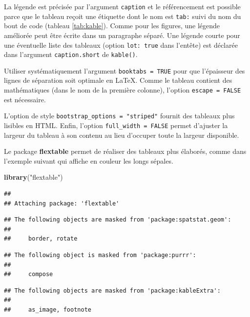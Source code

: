 \documentclass[
  12pt,
  french,
  a4paper,
  extrafontsizes,onecolumn,openright
  ]{memoir}
\newenvironment{Shaded}{\begin{snugshade}}{\end{snugshade}}
\newcommand{\KeywordTok}[1]{\textcolor[rgb]{0.13,0.29,0.53}{\textbf{#1}}}
\newcommand{\NormalTok}[1]{#1}
\newcommand{\StringTok}[1]{\textcolor[rgb]{0.31,0.60,0.02}{#1}}
\begin{document}
La légende est précisée par l'argument \texttt{caption} et le référencement est possible parce que le tableau reçoit une étiquette dont le nom est \texttt{tab:} suivi du nom du bout de code (tableau \ref{tab:kable}).
Comme pour les figures, une légende améliorée peut être écrite dans un paragraphe séparé.
Une légende courte pour une éventuelle liste des tableaux (option \texttt{lot:\ true} dans l'entête) est déclarée dans l'argument \texttt{caption.short} de \texttt{kable()}.

Utiliser systématiquement l'argument \texttt{booktabs\ =\ TRUE} pour que l'épaisseur des lignes de séparation soit optimale en LaTeX.
Comme le tableau contient des mathématiques (dans le nom de la première colonne), l'option \texttt{escape\ =\ FALSE} est nécessaire.

L'option de style \texttt{bootstrap\_options\ =\ "striped"} fournit des tableaux plus lisibles en HTML.
Enfin, l'option \texttt{full\_width\ =\ FALSE} permet d'ajuster la largeur du tableau à son contenu au lieu d'occuper toute la largeur disponible.

Le package \textbf{flextable} permet de réaliser des tableaux plus élaborés, comme dans l'exemple suivant qui affiche en couleur les longs sépales.

\scriptsize

\begin{Shaded}
\begin{Highlighting}[]
\KeywordTok{library}\NormalTok{(}\StringTok{"flextable"}\NormalTok{)}
\end{Highlighting}
\end{Shaded}

\begin{verbatim}
## 
## Attaching package: 'flextable'
\end{verbatim}

\begin{verbatim}
## The following objects are masked from 'package:spatstat.geom':
## 
##     border, rotate
\end{verbatim}

\begin{verbatim}
## The following object is masked from 'package:purrr':
## 
##     compose
\end{verbatim}

\begin{verbatim}
## The following objects are masked from 'package:kableExtra':
## 
##     as_image, footnote
\end{verbatim}
\end{document}
